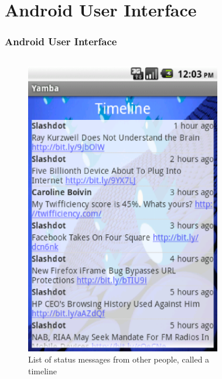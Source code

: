 \section{Android User Interface}
\begin{frame}
\frametitle{Android User Interface}
\begin{columns}
	\begin{figure}
	\includegraphics[width= 0.8 \textwidth]{fig-30.eps}
	\caption{List of status messages from other people, called a timeline}
	\end{figure}
	\begin{figure}

\end{figure}
\end{columns}
\end{frame}
